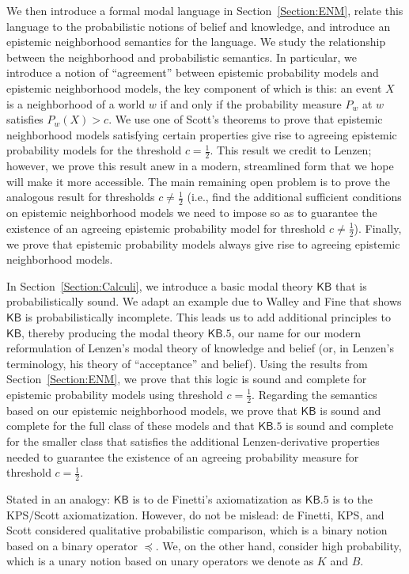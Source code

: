 \documentclass[12pt]{article}
\theoremstyle{definition}
\newcommand{\KB}{{\mathsf{KB}}}                 %
\newcommand{\KBeq}{{\mathsf{KB.5}}}             %
\begin{document}
We then introduce a formal modal language in
Section~\ref{Section:ENM}, relate this language to the probabilistic
notions of belief and knowledge, and introduce an epistemic
neighborhood semantics for the language.  We study the relationship
between the neighborhood and probabilistic semantics. In particular,
we introduce a notion of ``agreement'' between epistemic probability
models and epistemic neighborhood models, the key component of which
is this: an event $X$ is a neighborhood of a world $w$ if and only if
the probability measure $P_w$ at $w$ satisfies $P_w(X)>c$.  We use one
of Scott's theorems to prove that epistemic neighborhood models
satisfying certain properties give rise to agreeing epistemic
probability models for the threshold $c=\frac 12$.  This result we
credit to Lenzen; however, we prove this result anew in a modern,
streamlined form that we hope will make it more accessible.  The main
remaining open problem is to prove the analogous result for thresholds
$c\neq\frac 12$ (i.e., find the additional sufficient conditions on
epistemic neighborhood models we need to impose so as to guarantee the
existence of an agreeing epistemic probability model for threshold
$c\neq\frac 12$).  Finally, we prove that epistemic probability models
always give rise to agreeing epistemic neighborhood models.

In Section~\ref{Section:Calculi}, we introduce a basic modal theory
$\KB$ that is probabilistically sound.  We adapt an example due to
Walley and Fine \cite{WalleyFine1979:vomacp} that shows $\KB$ is
probabilistically incomplete.  This leads us to add additional
principles to $\KB$, thereby producing the modal theory $\KBeq$, our
name for our modern reformulation of Lenzen's modal theory of
knowledge and belief (or, in Lenzen's terminology, his theory of
``acceptance'' and belief).  Using the results from
Section~\ref{Section:ENM}, we prove that this logic is sound and
complete for epistemic probability models using threshold
$c=\frac 12$. Regarding the semantics based on our epistemic
neighborhood models, we prove that $\KB$ is sound and complete for the
full class of these models and that $\KBeq$ is sound and complete for
the smaller class that satisfies the additional Lenzen-derivative
properties needed to guarantee the existence of an agreeing
probability measure for threshold $c=\frac 12$.

Stated in an analogy: $\KB$ is to de Finetti's axiomatization as
$\KBeq$ is to the KPS/Scott axiomatization.  However, do not be
mislead: de Finetti, KPS, and Scott considered qualitative
probabilistic comparison, which is a binary notion based on a binary
operator $\preceq$.  We, on the other hand, consider high probability,
which is a unary notion based on unary operators we denote as $K$ and
$B$.
\end{document}
